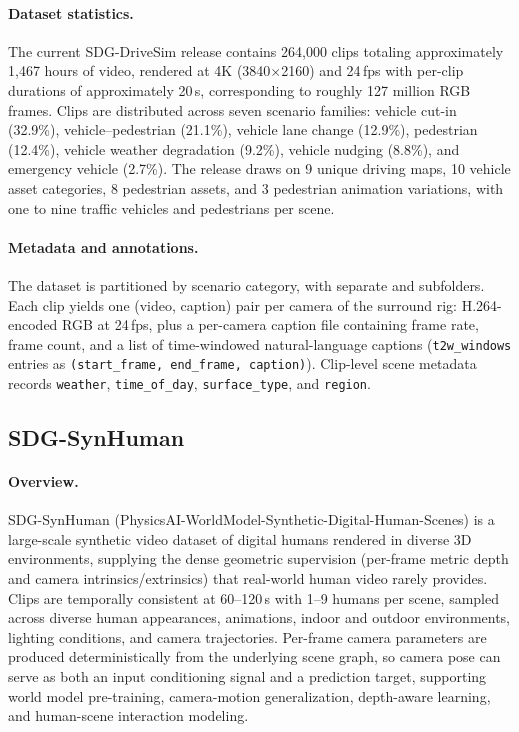 \paragraph{Dataset statistics.}
\label{appendix:sdg_drive_dataset_statistics}
The current SDG-DriveSim release contains 264{,}000 clips totaling
approximately 1{,}467 hours of video, rendered at 4K (3840$\times$2160) and
24\,fps with per-clip durations of approximately 20\,s, corresponding to
roughly 127 million RGB frames. Clips are distributed across seven scenario families: vehicle cut-in (32.9\%),
vehicle--pedestrian (21.1\%), vehicle lane change (12.9\%), pedestrian (12.4\%),
vehicle weather degradation (9.2\%), vehicle nudging (8.8\%), and emergency
vehicle (2.7\%). The release draws on
9 unique driving maps, 10 vehicle asset categories,
8 pedestrian assets, and 3 pedestrian animation variations,
with one to nine traffic vehicles and pedestrians per scene.

\paragraph{Metadata and annotations.}
\label{appendix:sdg_drive_metadata_annotations}
The dataset is partitioned by scenario category, with separate  and  subfolders. Each clip yields one (video, caption) pair per camera of the surround rig: H.264-encoded RGB at 24\,fps, plus a per-camera caption file containing frame rate, frame count, and a list of time-windowed natural-language captions (\texttt{t2w\_windows} entries as \texttt{(start\_frame, end\_frame, caption)}). Clip-level scene metadata records \texttt{weather}, \texttt{time\_of\_day}, \texttt{surface\_type}, and \texttt{region}.

\subsection{SDG-SynHuman}
\label{appendix:sdg_synhuman}

\paragraph{Overview.}
\label{appendix:sdg_synhuman_overview}
SDG-SynHuman (PhysicsAI-WorldModel-Synthetic-Digital-Human-Scenes) is a large-scale synthetic video dataset of digital humans rendered in diverse 3D environments, supplying the dense geometric supervision (per-frame metric depth and camera intrinsics/extrinsics) that real-world human video rarely provides. Clips are temporally consistent at 60--120\,s with 1--9 humans per scene, sampled across diverse human appearances, animations, indoor and outdoor environments, lighting conditions, and camera trajectories. Per-frame camera parameters are produced deterministically from the underlying scene graph, so camera pose can serve as both an input conditioning signal and a prediction target, supporting world model pre-training, camera-motion generalization, depth-aware learning, and human-scene interaction modeling.



